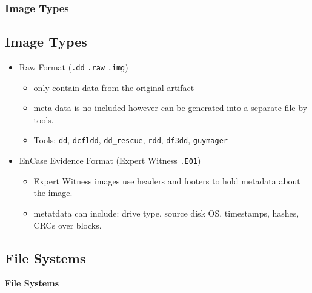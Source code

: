 \documentclass{beamer}
\begin{document}
\begin{frame}
	\frametitle{Image Types}
	\subsection*{Image Types}
	\begin{itemize}
		\item Raw Format (\texttt{.dd} \texttt{.raw} \texttt{.img})
		\begin{itemize}
			\item only contain data from the original artifact
			\item meta data is no included however can be generated into a separate file by tools.
			\item Tools: \texttt{dd}, \texttt{dcfldd}, \texttt{dd\_rescue}, \texttt{rdd}, \texttt{df3dd}, \texttt{guymager}
		\end{itemize}
		\item EnCase Evidence Format (Expert Witness \texttt{.E01})
		\begin{itemize}
			\item Expert Witness images use headers and footers to hold metadata about the image.
			\item metatdata can include: drive type, source disk OS, timestamps, hashes, CRCs over blocks.
		\end{itemize}
	\end{itemize}
\end{frame}

\begin{frame}%
	\section{File Systems}
	\begin{center}
		\Huge\textbf{File Systems}
	\end{center}
\end{frame}
\end{document}
